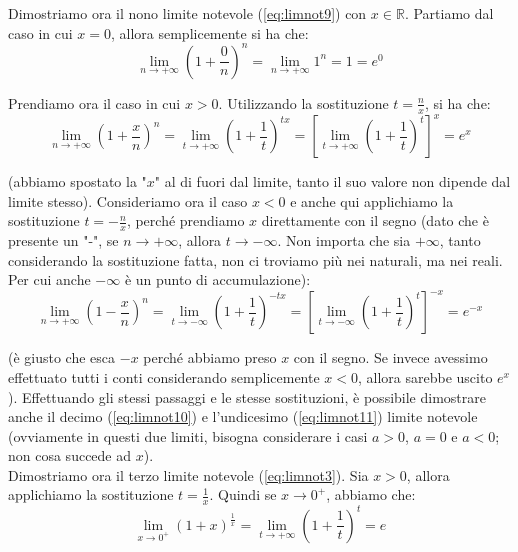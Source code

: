 \documentclass{article}
\begin{document}
\noindent Dimostriamo ora il nono limite notevole (\ref{eq:limnot9}) con $x \in \mathbb{R}$. Partiamo dal caso in cui $x = 0$, allora semplicemente si ha che:
\begin{equation*}
    \lim_{n \to +\infty} \left(1 + \frac{0}{n}\right)^n =  \lim_{n \to +\infty} 1^n = 1 = e^0
\end{equation*}

\noindent Prendiamo ora il caso in cui $x > 0$. Utilizzando la sostituzione $t = \frac{n}{x}$, si ha che:
\begin{equation*}
    \lim_{n \to +\infty} \left(1 + \frac{x}{n}\right)^n = \lim_{t \to +\infty} \left(1 + \frac{1}{t}\right)^{tx} = \left[\lim_{t \to +\infty} \left(1 + \frac{1}{t}\right)^t\right]^x = e^x
\end{equation*}

\noindent (abbiamo spostato la "$x$" al di fuori dal limite, tanto il suo valore non dipende dal limite stesso). Consideriamo ora il caso $x < 0$ e anche qui applichiamo la sostituzione $t = -\frac{n}{x}$, perché prendiamo $x$ direttamente con il segno (dato che è presente un "-", se $n \to +\infty$, allora $t \to -\infty$. Non importa che sia $+\infty$, tanto considerando la sostituzione fatta, non ci troviamo più nei naturali, ma nei reali. Per cui anche $-\infty$ è un punto di accumulazione):
\begin{equation*}
    \lim_{n \to +\infty} \left(1 - \frac{x}{n}\right)^n = \lim_{t \to -\infty} \left(1 + \frac{1}{t}\right)^{-tx} = \left[\lim_{t \to -\infty} \left(1 + \frac{1}{t}\right)^t\right]^{-x} = e^{-x}
\end{equation*}

\noindent (è giusto che esca $-x$ perché abbiamo preso $x$ con il segno. Se invece avessimo effettuato tutti i conti considerando semplicemente $x < 0$, allora sarebbe uscito $e^x$). Effettuando gli stessi passaggi e le stesse sostituzioni, è possibile dimostrare anche il decimo (\ref{eq:limnot10}) e l'undicesimo (\ref{eq:limnot11}) limite notevole (ovviamente in questi due limiti, bisogna considerare i casi $a > 0$, $a = 0$ e $a < 0$; non cosa succede ad $x$).\\

\noindent Dimostriamo ora il terzo limite notevole (\ref{eq:limnot3}). Sia $x > 0$, allora applichiamo la sostituzione $t = \frac{1}{x}$. Quindi se $x \to 0^+$, abbiamo che:
\begin{equation*}
    \lim_{x \to 0^+} (1 + x)^\frac{1}{x} = \lim_{t \to +\infty} \left(1 + \frac{1}{t}\right)^t = e
\end{equation*}
\end{document}
